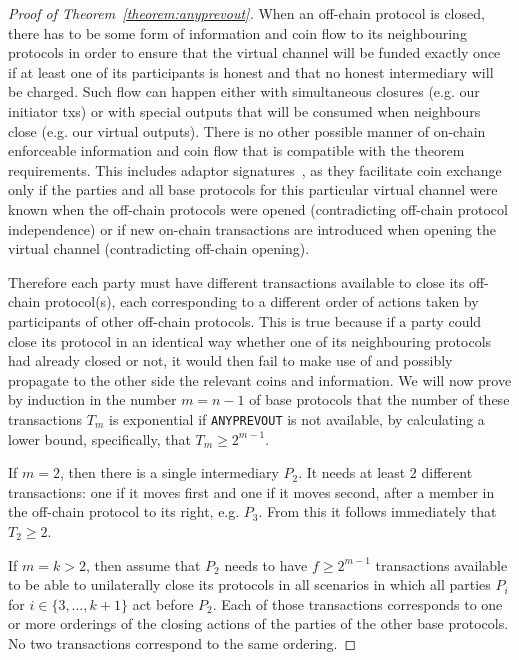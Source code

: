   \begin{proof}[Proof of Theorem~\ref{theorem:anyprevout}]
    When an off-chain protocol is closed, there has to be some form of
    information and coin flow to its %
    neighbouring protocols in order
    to ensure that the virtual channel will be funded exactly once if at least
    one of its participants is honest and that no honest intermediary will be
    charged. Such flow can happen either with simultaneous closures (e.g. our
    initiator txs) or with special outputs that will be consumed when neighbours
    close (e.g. our virtual outputs). There is no other possible manner of
    on-chain enforceable information and coin flow that is compatible with the
    theorem requirements. This includes adaptor
    signatures~\cite{cryptoeprint:2020:476}, as they facilitate coin exchange
    only if the parties and all base protocols for this particular virtual
    channel were known when the off-chain protocols were opened (contradicting
    off-chain protocol independence) or if new on-chain transactions are
    introduced when opening the virtual channel (contradicting off-chain
    opening).

    Therefore each party must have different transactions available to close its
    off-chain protocol(s), each corresponding to a different order of actions
    taken by participants of other off-chain protocols. This is true because if
    a party could close its protocol in an identical way whether one of its
    neighbouring protocols had already closed or not, it would then fail to make
    use of and possibly propagate to the other side the relevant coins and
    information. We will now prove by induction in the number $m = n - 1$ of
    base protocols that the number of these transactions $T_m$ is exponential if
    \texttt{ANYPREVOUT} is not available, by calculating a lower bound, specifically,
    that $T_m \geq 2^{m-1}$. 

    If $m = 2$, then there is a single intermediary $P_2$. It needs at least $2$
    different transactions: one if it moves first and one if it moves second,
    after a member in the off-chain protocol to its right, e.g. $P_3$.
    From this it follows immediately that $T_2 \geq 2$. 

    If $m = k > 2$, then assume that $P_2$ needs to have $f\geq 2^{m-1}$ transactions
    available to be able to unilaterally close its protocols in all scenarios in
    which all parties $P_i$ for $i \in \{3, \dots, k+1\}$ act before $P_2$. Each
    of those transactions corresponds to one or more orderings of the closing
    actions of the parties of the other base protocols. No two transactions
    correspond to the same ordering.


\end{proof}
